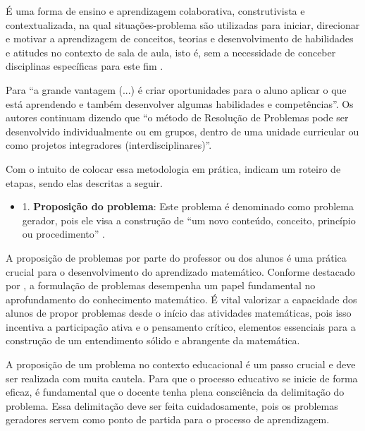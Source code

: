 \begin{citacao}
    É uma forma de ensino e aprendizagem colaborativa, construtivista e contextualizada, na qual situações-problema são utilizadas para iniciar, direcionar e motivar a aprendizagem de conceitos, teorias e desenvolvimento de habilidades e atitudes no contexto de sala de aula, isto é, sem a necessidade de conceber disciplinas específicas para este fim \cite[p. 48]{SOUZA2016}.
\end{citacao}

Para  ``a grande vantagem (...) é criar oportunidades para o aluno aplicar o que está aprendendo e também desenvolver algumas habilidades e competências''. Os autores continuam dizendo que ``o método de Resolução de Problemas pode ser desenvolvido individualmente ou em grupos, dentro de uma unidade curricular ou como projetos integradores (interdisciplinares)''.

Com o intuito de colocar essa metodologia em prática,  indicam um roteiro de etapas, sendo elas descritas a seguir.


\begin{itemize}
    \item 1. \textbf{Proposição do problema}: Este problema é denominado como problema gerador, pois ele visa a construção de ``um novo conteúdo, conceito, princípio ou procedimento'' \cite{resolucaoDeProblemas2019}.
\end{itemize}

A proposição de problemas por parte do professor ou dos alunos é uma prática crucial para o desenvolvimento do aprendizado matemático. Conforme destacado por \cite{CAI-etal2015}, a formulação de problemas desempenha um papel fundamental no aprofundamento do conhecimento matemático. É vital valorizar a capacidade dos alunos de propor problemas desde o início das atividades matemáticas, pois isso incentiva a participação ativa e o pensamento crítico, elementos essenciais para a construção de um entendimento sólido e abrangente da matemática.

A proposição de um problema no contexto educacional é um passo crucial e deve ser realizada com muita cautela. Para que o processo educativo se inicie de forma eficaz, é fundamental que o docente tenha plena consciência da delimitação do problema. Essa delimitação deve ser feita cuidadosamente, pois os problemas geradores servem como ponto de partida para o processo de aprendizagem.

